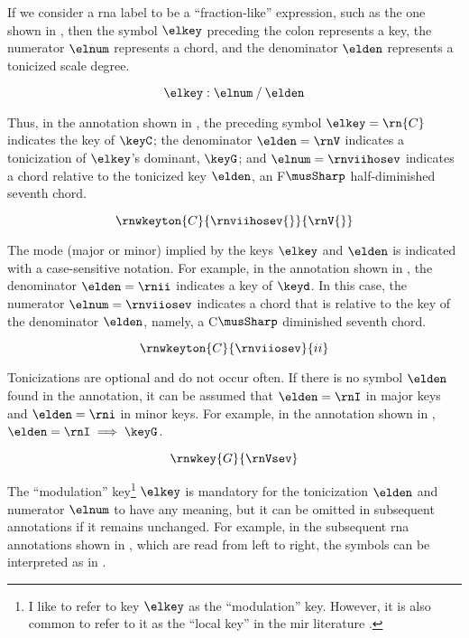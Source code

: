 
If we consider a \gls{rna} label to be a ``fraction-like''
expression, such as the one shown in ,
then the symbol $\elkey$ preceding the colon represents a
key, the numerator $\elnum$ represents a chord, and the
denominator $\elden$ represents a tonicized scale degree.

\begin{equation}
    \label{eq:rn_expression}
    \elkey : \elnum \: / \: \elden
\end{equation}

Thus, in the annotation shown in , the
preceding symbol $\elkey=\rn{C}$ indicates the key of
$\keyC$; the denominator $\elden = \rnV$ indicates a
tonicization of $\elkey$'s dominant, $\keyG$; and
$\elnum=\rnviihosev$ indicates a chord relative to the
tonicized key $\elden$, an F$\musSharp$ half-diminished
seventh chord.

\begin{equation}
    \label{eq:rn_example1}
    \rnwkeyton{C}{\rnviihosev{}}{\rnV{}}
\end{equation}


The mode (major or minor) implied by the keys $\elkey$ and
$\elden$ is indicated with a case-sensitive notation. For
example, in the annotation shown in , the
denominator $\elden=\rnii$ indicates a key of $\keyd$. In
this case, the numerator $\elnum = \rnviiosev$ indicates a
chord that is relative to the key of the denominator
$\elden$, namely, a C$\musSharp$ diminished seventh chord.

\begin{equation}
    \label{eq:rn_example2}
    \rnwkeyton{C}{\rnviiosev}{ii}
\end{equation}

Tonicizations are optional and do not occur often. If there
is no symbol $\elden$ found in the annotation, it can be
assumed that $\elden = \rnI$ in major keys and $\elden =
\rni$ in minor keys. For example, in the annotation shown in
, $\elden = \rnI \implies \keyG$.

\begin{equation}
    \label{eq:rn_example3}
    \rnwkey{G}{\rnVsev}
\end{equation}

The ``modulation'' key\footnote{I like to refer to key
$\elkey$ as the ``modulation'' key. However, it is also
common to refer to it as the ``local key'' in the \gls{mir}
literature \parencite{napoleslopez2020local}.} $\elkey$ is
mandatory for the tonicization $\elden$ and numerator
$\elnum$ to have any meaning, but it can be omitted in
subsequent annotations if it remains unchanged. For example,
in the subsequent \gls{rna} annotations shown in
, which are read from left to
right, the symbols can be interpreted as in
.

